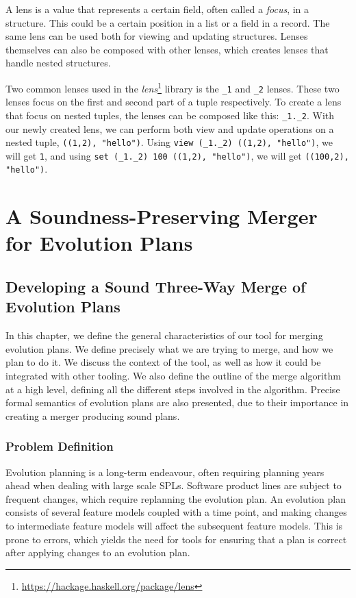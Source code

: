 \documentclass[a4paper,english]{ifimaster}
\begin{document}
A lens is a value that represents a certain field, often called a \textit{focus}, in a structure. This could be a certain position in a list or a field in a record. The same lens can be used both for viewing and updating structures. Lenses themselves can also be composed with other lenses, which creates lenses that handle nested structures.

Two common lenses used in the \textit{lens}\footnote{\url{https://hackage.haskell.org/package/lens}} library is the \texttt{\_1} and \texttt{\_2} lenses. These two lenses focus on the first and second part of a tuple respectively. To create a lens that focus on nested tuples, the lenses can be composed like this: \texttt{\_1.\_2}. With our newly created lens, we can perform both view and update operations on a nested tuple, \texttt{((1,2), "hello")}. Using \texttt{view (\_1.\_2) ((1,2), "hello")}, we will get \texttt{1}, and using \texttt{set (\_1.\_2) 100 ((1,2), "hello")}, we will get \texttt{((100,2), "hello")}.

\part{A Soundness-Preserving Merger for Evolution Plans}%
\label{prt:a_sound_semantic_merger_for_evolution_plans}

\chapter{Developing a Sound Three-Way Merge of Evolution Plans}%
\label{cha:developing_a_sound_three_way_merge_of_evolution_plans}

In this chapter, we define the general characteristics of our tool for merging evolution plans. We define precisely what we are trying to merge, and how we plan to do it. We discuss the context of the tool, as well as how it could be integrated with other tooling. We also define the outline of the merge algorithm at a high level, defining all the different steps involved in the algorithm. Precise formal semantics of evolution plans are also presented, due to their importance in creating a merger producing sound plans.

\section{Problem Definition}%
\label{sec:problem_defintion}

Evolution planning is a long-term endeavour, often requiring planning years ahead when dealing with large scale SPLs. Software product lines are subject to frequent changes, which require replanning the evolution plan. An evolution plan consists of several feature models coupled with a time point, and making changes to intermediate feature models will affect the subsequent feature models. This is prone to errors, which yields the need for tools for ensuring that a plan is correct after applying changes to an evolution plan.
\end{document}
